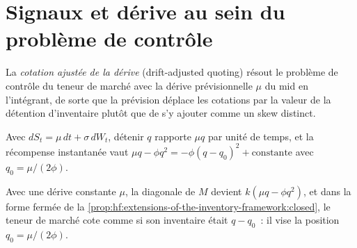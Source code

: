 \begin{omfigure}

\label{fig:hf:extensions-of-the-inventory-framework:frontier}
\end{omfigure}

\section{Signaux et dérive au sein du problème de contrôle}

\begin{definition}\label{def:hf:extensions-of-the-inventory-framework:drift}
La \emph{cotation ajustée de la dérive} (drift-adjusted quoting) résout le problème de contrôle du teneur de marché avec la dérive prévisionnelle $\mu$ du mid
en l'intégrant, de sorte que la prévision déplace les cotations par la valeur de la détention d'inventaire plutôt que de s'y ajouter comme un skew distinct.
\end{definition}

Avec $dS_t=\mu\,dt+\sigma\,dW_t$, détenir $q$ rapporte $\mu q$ par unité de temps, et la récompense instantanée vaut $\mu q-\phi q^2=-\phi(q-q_0)^2+\text{constante}$ avec
$q_0=\mu/(2\phi)$.

\begin{proposition}\label{prop:hf:extensions-of-the-inventory-framework:target}
Avec une dérive constante $\mu$, la diagonale de $M$ devient $k(\mu q-\phi q^2)$, et dans la forme fermée de la
\cref{prop:hf:extensions-of-the-inventory-framework:closed}, le teneur de marché cote comme si son inventaire était $q-q_0$~: il vise la position
$q_0=\mu/(2\phi)$.
\end{proposition}

